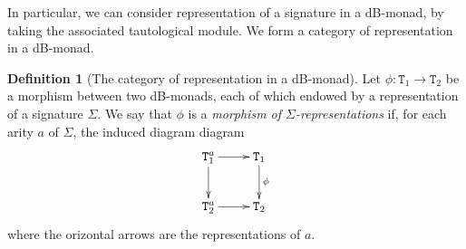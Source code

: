 \documentclass[a4paper,twoside,12pt]{article}
\theoremstyle{definition}
\newtheorem{definition}{Definition}
\theoremstyle{remark}
\theoremstyle{example}
\newcommand{\TT}{\mathtt{T}}
\begin{document}
In particular, we can consider representation of a signature in a
dB-monad, by taking the associated tautological module.  We form a
category of representation in a dB-monad.

\begin{definition}[The category of representation in a dB-monad]
  Let $\phi \colon \TT_1 \to \TT_2$ be a morphism between two
  dB-monads, each of which endowed by a representation of a signature
  $\Sigma$.  We say that $\phi$ is a \emph{morphism of
    $\Sigma$-representations} if, for each arity $a$ of $\Sigma$, the
  induced diagram diagram
  \begin{equation*}
    \xymatrix{
      \TT_1^a\ar[d]\ar[r] & \TT_1\ar[d]^\phi \\
      \TT_2^a \ar[r] & \TT_2}
  \end{equation*}
  where the orizontal arrows are the representations of $a$.
\end{definition}


%

\end{document}
